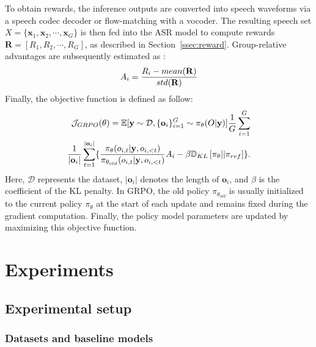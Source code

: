 \documentclass{article}
\begin{document}
To obtain rewards, the inference outputs are converted into speech waveforms via a speech codec decoder or flow-matching with a vocoder. The resulting speech set $X=\{\mathbf{x}_1, \mathbf{x}_2, \cdots, \mathbf{x}_G \}$ is then fed into the ASR model to compute rewards $\mathbf{R}=[R_1, R_2, \cdots, R_G]$, as described in Section~\ref{ssec:reward}. Group-relative advantages are subsequently estimated as \cite{deepseekmath}:
\begin{equation}
\setlength\abovedisplayskip{3pt}
\setlength\belowdisplayskip{3pt}
A_i = \frac{R_i-mean(\mathbf{R})}{std(\mathbf{R})}
\end{equation}
Finally, the objective function is defined as follow:
\begin{equation}
\setlength\abovedisplayskip{3pt}
\setlength\belowdisplayskip{3pt}
\begin{split}
\mathcal{J}_{GRPO}(\theta) = \mathbb{E}[\mathbf{y} \sim \mathcal{D}, \{\mathbf{o}_{i}\}_{i=1}^G \sim \pi_\theta(O|\mathbf{y})]\frac{1}{G}\sum_{i=1}^{G} \\
\frac{1}{|\mathbf{o}_i|}\sum_{t=1}^{|\mathbf{o}_i|} \{ \frac{\pi_{\theta}(o_{i,t}|\mathbf{y}, o_{i,<t})}{\pi_{\theta_{old}}(o_{i,t}|\mathbf{y}, o_{i,<t})}A_{i}  - \beta \mathbb{D}_{KL} \left[ \pi_{\theta} || \pi_{ref} \right]\}.
\end{split}
\end{equation}
Here, $\mathcal{D}$ represents the dataset, $|\mathbf{o}_i|$ denotes the length of $\mathbf{o}_i$, and $\beta$ is the coefficient of the KL penalty. In GRPO, the old policy $\pi_{\theta_{old}}$ is usually initialized to the current policy $\pi_\theta$ at the start of each update and remains fixed during the gradient computation. Finally, the policy model parameters are updated by maximizing this objective function.

\vspace{-0.2cm}
\section{Experiments}
\label{sec:exp}
\vspace{-0.2cm}

\subsection{Experimental setup}
\label{ssec:setup}
\vspace{-0.2cm}
\subsubsection{Datasets and baseline models}
\vspace{-0.2cm}
\end{document}
